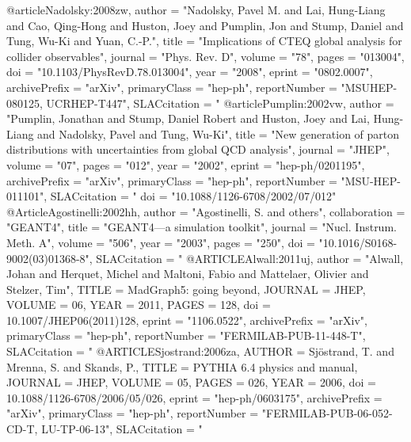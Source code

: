 @article{Nadolsky:2008zw,
      author         = "Nadolsky, Pavel M. and Lai, Hung-Liang and Cao, Qing-Hong
                        and Huston, Joey and Pumplin, Jon and Stump, Daniel and Tung, Wu-Ki and Yuan, C.-P.",
      title          = "{Implications of {CTEQ} global analysis for collider
                        observables}",
      journal        = "Phys. Rev. D",
      volume         = "78",
      pages          = "013004",
      doi            = "10.1103/PhysRevD.78.013004",
      year           = "2008",
      eprint         = "0802.0007",
      archivePrefix  = "arXiv",
      primaryClass   = "hep-ph",
      reportNumber   = "MSUHEP-080125, UCRHEP-T447",
      SLACcitation   = "%
}
@article{Pumplin:2002vw,
      author         = "Pumplin, Jonathan and Stump, Daniel Robert and Huston, Joey and Lai, Hung-Liang
                        and Nadolsky, Pavel and Tung, Wu-Ki",
      title          = "{New generation of parton distributions with
                        uncertainties from global {QCD} analysis}",
      journal        = "JHEP",
      volume         = "07",
      pages          = "012",
      year           = "2002",
      eprint         = "hep-ph/0201195",
      archivePrefix  = "arXiv",
      primaryClass   = "hep-ph",
      reportNumber   = "MSU-HEP-011101",
      SLACcitation   = "%
      doi            = "10.1088/1126-6708/2002/07/012"
}
@Article{Agostinelli:2002hh,
     author    = "Agostinelli, S. and others",
     collaboration = "GEANT4",
     title     = "{GEANT4}---a simulation toolkit",
     journal   = "Nucl. Instrum. Meth. A",
     volume    = "506",
     year      = "2003",
     pages     = "250",
     doi       = "10.1016/S0168-9002(03)01368-8",
     SLACcitation  = "%
}
@ARTICLE{Alwall:2011uj,
  author         = "Alwall, Johan and Herquet, Michel and Maltoni, Fabio and
                    Mattelaer, Olivier and Stelzer, Tim",
  TITLE          = {{M}ad{G}raph5: going beyond},
  JOURNAL        = {JHEP},
  VOLUME         = {06},
  YEAR           = {2011},
  PAGES          = {128},
  doi            = {10.1007/JHEP06(2011)128},
      eprint         = "1106.0522",
      archivePrefix  = "arXiv",
      primaryClass   = "hep-ph",
      reportNumber   = "FERMILAB-PUB-11-448-T",
  SLACcitation   = "%
}
@ARTICLE{Sjostrand:2006za,
  AUTHOR         = {Sj{\"o}strand, T. and Mrenna, S. and Skands, P.},
  TITLE          = {{PYTHIA} 6.4 physics and manual},
  JOURNAL        = {JHEP},
  VOLUME         = {05},
  PAGES          = {026},
  YEAR           = {2006},
  doi            = {10.1088/1126-6708/2006/05/026},
      eprint         = "hep-ph/0603175",
      archivePrefix  = "arXiv",
      primaryClass   = "hep-ph",
      reportNumber   = "FERMILAB-PUB-06-052-CD-T, LU-TP-06-13",
      SLACcitation   = "%
}
